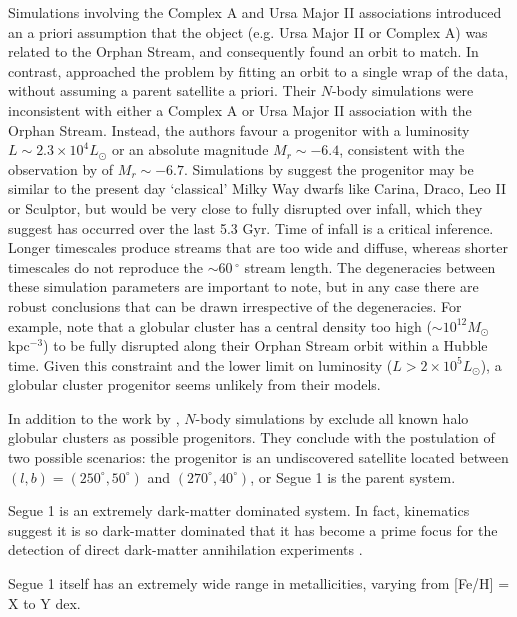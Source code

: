\documentclass{emulateapj}
\begin{document}
Simulations involving the Complex A and Ursa Major II associations introduced an a priori assumption that the object (e.g. Ursa Major II or Complex A) was related to the Orphan Stream, and consequently found an orbit to match. In contrast, \citet{sales;et-al_2008} approached the problem by fitting an orbit to a single wrap of the data, without assuming a parent satellite a priori. Their $N$-body simulations were inconsistent with either a Complex A or Ursa Major II association with the Orphan Stream. Instead, the authors favour a progenitor with a luminosity $L \sim 2.3 \times 10^4 L_\odot$ or an absolute magnitude $M_r \sim -6.4$, consistent with the observation by \citet{belokurov;et-al_2007} of $M_r \sim -6.7$. Simulations by \citet{sales;et-al_2008} suggest the progenitor may be similar to the present day `classical' Milky Way dwarfs like Carina, Draco, Leo II or Sculptor, but would be very close to fully disrupted over infall, which they suggest has occurred over the last 5.3 Gyr. Time of infall is a critical inference. Longer timescales produce streams that are too wide and diffuse, whereas shorter timescales do not reproduce the $\sim{}$60\,$^\circ$ stream length. The degeneracies between these simulation parameters are important to note, but in any case there are robust conclusions that can be drawn irrespective of the degeneracies. For example, \citet{sales;et-al_2008} note that a globular cluster has a central density too high ($\sim10^{12} M_\odot$\,kpc$^{-3}$) to be fully disrupted along their Orphan Stream orbit within a Hubble time. Given this constraint and the lower limit on luminosity ($L > 2\times10^5 L_\odot$), a globular cluster progenitor seems unlikely from their models.

In addition to the work by \citet{sales;et-al_2008}, $N$-body simulations by \citet{newberg;et-al_2010} exclude all known halo globular clusters as possible progenitors. They conclude with the postulation of two possible scenarios: the progenitor is an undiscovered satellite located between $(l, b) = (250^\circ, 50^\circ)$ and $(270^\circ, 40^\circ)$, or Segue 1 is the parent system. 

Segue 1 is an extremely dark-matter dominated system. In fact, kinematics suggest it is so dark-matter dominated that it has become a prime focus for the detection of direct dark-matter annihilation experiments \citep{dm_dominated}.

Segue 1 itself has an extremely wide range in metallicities, varying from [Fe/H] = X to Y dex. 
\end{document}
